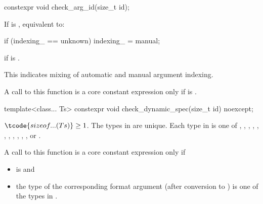 %
\begin{itemdecl}
constexpr void check_arg_id(size_t id);
\end{itemdecl}

\begin{itemdescr}
\pnum
\effects
If  is , equivalent to:
\begin{codeblock}
if (indexing_ == unknown)
  indexing_ = manual;
\end{codeblock}

\pnum
\throws
{} if
 is .
\begin{note}
This indicates mixing of automatic and manual argument indexing.
\end{note}

\pnum
\remarks
A call to this function is a core constant expression only if
 is .
\end{itemdescr}

%
\begin{itemdecl}
template<class... Ts>
  constexpr void check_dynamic_spec(size_t id) noexcept;
\end{itemdecl}

\begin{itemdescr}
\pnum
\mandates
$\tcode{sizeof...(Ts)} \ge 1$.
The types in  are unique.
Each type in  is one of
,
,
,
,
,
,
,
,
,
,
, or
.

\pnum
\remarks
A call to this function is a core constant expression only if
\begin{itemize}
\item
{} is  and
\item
the type of the corresponding format argument
(after conversion to ) is one of the types in .
\end{itemize}
\end{itemdescr}

